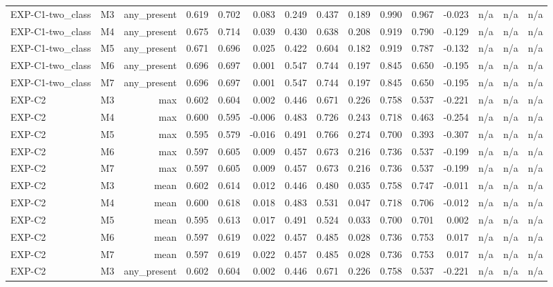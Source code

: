\begin{table}[htbp]
\begin{tabular}{lrrrrrrrrrrrrrr}
    EXP-C1-two\_class & M3 & any\_present & 0.619 & 0.702 & 0.083 & 0.249 & 0.437 & 0.189 & 0.990 & 0.967 & -0.023 & n/a & n/a & n/a \\
    EXP-C1-two\_class & M4 & any\_present & 0.675 & 0.714 & 0.039 & 0.430 & 0.638 & 0.208 & 0.919 & 0.790 & -0.129 & n/a & n/a & n/a \\
    EXP-C1-two\_class & M5 & any\_present & 0.671 & 0.696 & 0.025 & 0.422 & 0.604 & 0.182 & 0.919 & 0.787 & -0.132 & n/a & n/a & n/a \\
    EXP-C1-two\_class & M6 & any\_present & 0.696 & 0.697 & 0.001 & 0.547 & 0.744 & 0.197 & 0.845 & 0.650 & -0.195 & n/a & n/a & n/a \\
    EXP-C1-two\_class & M7 & any\_present & 0.696 & 0.697 & 0.001 & 0.547 & 0.744 & 0.197 & 0.845 & 0.650 & -0.195 & n/a & n/a & n/a \\
    EXP-C2 & M3 & max & 0.602 & 0.604 & 0.002 & 0.446 & 0.671 & 0.226 & 0.758 & 0.537 & -0.221 & n/a & n/a & n/a \\
    EXP-C2 & M4 & max & 0.600 & 0.595 & -0.006 & 0.483 & 0.726 & 0.243 & 0.718 & 0.463 & -0.254 & n/a & n/a & n/a \\
    EXP-C2 & M5 & max & 0.595 & 0.579 & -0.016 & 0.491 & 0.766 & 0.274 & 0.700 & 0.393 & -0.307 & n/a & n/a & n/a \\
    EXP-C2 & M6 & max & 0.597 & 0.605 & 0.009 & 0.457 & 0.673 & 0.216 & 0.736 & 0.537 & -0.199 & n/a & n/a & n/a \\
    EXP-C2 & M7 & max & 0.597 & 0.605 & 0.009 & 0.457 & 0.673 & 0.216 & 0.736 & 0.537 & -0.199 & n/a & n/a & n/a \\
    EXP-C2 & M3 & mean & 0.602 & 0.614 & 0.012 & 0.446 & 0.480 & 0.035 & 0.758 & 0.747 & -0.011 & n/a & n/a & n/a \\
    EXP-C2 & M4 & mean & 0.600 & 0.618 & 0.018 & 0.483 & 0.531 & 0.047 & 0.718 & 0.706 & -0.012 & n/a & n/a & n/a \\
    EXP-C2 & M5 & mean & 0.595 & 0.613 & 0.017 & 0.491 & 0.524 & 0.033 & 0.700 & 0.701 & 0.002 & n/a & n/a & n/a \\
    EXP-C2 & M6 & mean & 0.597 & 0.619 & 0.022 & 0.457 & 0.485 & 0.028 & 0.736 & 0.753 & 0.017 & n/a & n/a & n/a \\
    EXP-C2 & M7 & mean & 0.597 & 0.619 & 0.022 & 0.457 & 0.485 & 0.028 & 0.736 & 0.753 & 0.017 & n/a & n/a & n/a \\
    EXP-C2 & M3 & any\_present & 0.602 & 0.604 & 0.002 & 0.446 & 0.671 & 0.226 & 0.758 & 0.537 & -0.221 & n/a & n/a & n/a \\

\end{tabular}
\end{table}
